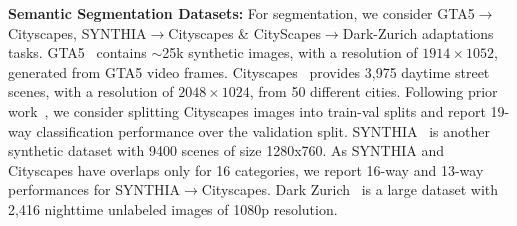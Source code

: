 \documentclass[10pt,twocolumn,letterpaper]{article}
\begin{document}
\noindent \textbf{Semantic Segmentation Datasets:}
For segmentation, we consider GTA5$\to$Cityscapes, SYNTHIA$\to$Cityscapes \& CityScapes$\to$Dark-Zurich adaptations tasks. GTA5~\cite{richter2016playing} contains $\sim$25k synthetic images, with a resolution of $1914\times1052$, generated from GTA5 video frames. Cityscapes~\cite{cordts2016cityscapes} provides 3,975 daytime street scenes, with a resolution of $2048\times1024$, from 50 different cities. Following prior work~\cite{hoffman2018cycada,vu2019advent,zou2019confidence}, we consider splitting Cityscapes images into train-val splits and report 19-way classification performance over the validation split. SYNTHIA~\cite{ros2016synthia} is another synthetic dataset with 9400 scenes of size 1280x760. As SYNTHIA and Cityscapes have overlaps only for 16 categories, we report 16-way and 13-way performances for SYNTHIA$\to$Cityscapes. Dark Zurich~\cite{sakaridis2019guided} is a large dataset with 2,416 nighttime unlabeled images of 1080p resolution.
\end{document}
